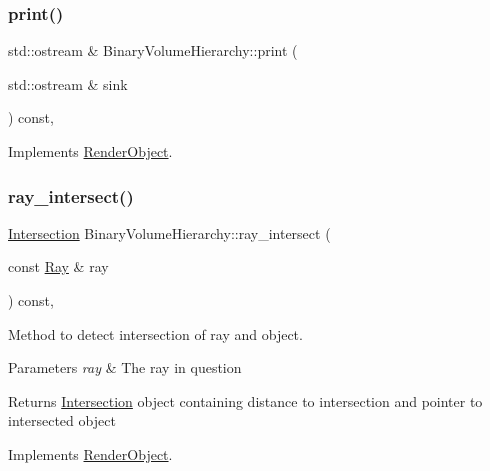 \subsubsection{\texorpdfstring{print()}{print()}}
{\footnotesize\ttfamily std\+::ostream \& Binary\+Volume\+Hierarchy\+::print (\begin{DoxyParamCaption}\item[{std\+::ostream \&}]{sink }\end{DoxyParamCaption}) const\hspace{0.3cm}{\ttfamily [override]}, {\ttfamily [virtual]}}



Implements \mbox{\hyperlink{classRenderObject_a7a7f1168a7d96ca95235b170ff7fb11b}{Render\+Object}}.

\mbox{\label{classBinaryVolumeHierarchy_aae4af0a21170bb122692314b0fbf399a}} 
\subsubsection{\texorpdfstring{ray\_intersect()}{ray\_intersect()}}
{\footnotesize\ttfamily \mbox{\hyperlink{classIntersection}{Intersection}} Binary\+Volume\+Hierarchy\+::ray\+\_\+intersect (\begin{DoxyParamCaption}\item[{const \mbox{\hyperlink{classRay}{Ray}} \&}]{ray }\end{DoxyParamCaption}) const\hspace{0.3cm}{\ttfamily [override]}, {\ttfamily [virtual]}}



Method to detect intersection of ray and object. 


\begin{DoxyParams}{Parameters}
{\em ray} & The ray in question \\
\hline
\end{DoxyParams}
\begin{DoxyReturn}{Returns}
\mbox{\hyperlink{classIntersection}{Intersection}} object containing distance to intersection and pointer to intersected object 
\end{DoxyReturn}


Implements \mbox{\hyperlink{classRenderObject_aa844ad2c5ef0c2b79faef2ed0af553bb}{Render\+Object}}.



